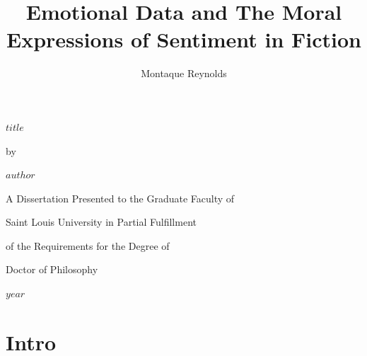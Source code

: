 \documentclass[
  12pt,
]{book}
\title{Emotional Data and The Moral Expressions of Sentiment in Fiction}
\author{Montaque Reynolds}
\date{}
\theoremstyle{definition}
\theoremstyle{definition}
\theoremstyle{definition}
\theoremstyle{definition}
\theoremstyle{remark}
\begin{document}
\maketitle

{
\setcounter{tocdepth}{2}
\tableofcontents
}
\begin{titlepage}
\centering
\vspace*{1cm}

{\Large\bfseries\MakeUppercase{$title$}\par}

\vspace{2cm}

{\large by\par}
\vspace{1cm}

{\large $author$\par}

\vspace{1cm}

{\large A Dissertation Presented to the Graduate Faculty of\par}
{\large Saint Louis University in Partial Fulfillment\par}
{\large of the Requirements for the Degree of\par}
{\large Doctor of Philosophy\par}

\vfill

{\large $year$\par}

\end{titlepage}

\newpage

\chapter{Intro}\label{intro}
\end{document}
